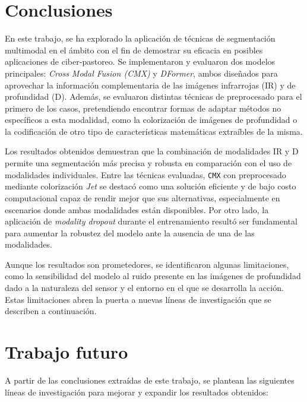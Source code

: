 \documentclass[12pt,a4paper]{report}
\begin{document}
\section{Conclusiones}
En este trabajo, se ha explorado la aplicación de técnicas de segmentación multimodal en el ámbito con el fin de demostrar su eficacia en posibles aplicaciones de ciber-pastoreo. Se implementaron y evaluaron dos modelos principales: \textit{Cross Modal Fusion (CMX)} y \textit{DFormer}, ambos diseñados para aprovechar la información complementaria de las imágenes infrarrojas (IR) y de profundidad (D). Además, se evaluaron distintas técnicas de preprocesado para el primero de los casos, pretendiendo encontrar formas de adaptar métodos no específicos a esta modalidad, como la colorización de imágenes de profundidad o la codificación de otro tipo de características matemáticas extraíbles de la misma.

Los resultados obtenidos demuestran que la combinación de modalidades IR y D permite una segmentación más precisa y robusta en comparación con el uso de modalidades individuales. Entre las técnicas evaluadas, \texttt{CMX} con preprocesado mediante colorización \textit{Jet} se destacó como una solución eficiente y de bajo costo computacional capaz de rendir mejor que sus alternativas, especialmente en escenarios donde ambas modalidades están disponibles. Por otro lado, la aplicación de \textit{modality dropout} durante el entrenamiento resultó ser fundamental para aumentar la robustez del modelo ante la ausencia de una de las modalidades.

Aunque los resultados son prometedores, se identificaron algunas limitaciones, como la sensibilidad del modelo al ruido presente en las imágenes de profundidad dado a la naturaleza del sensor y el entorno en el que se desarrolla la acción. Estas limitaciones abren la puerta a nuevas líneas de investigación que se describen a continuación.

\section{Trabajo futuro}
A partir de las conclusiones extraídas de este trabajo, se plantean las siguientes líneas de investigación para mejorar y expandir los resultados obtenidos:
\end{document}
